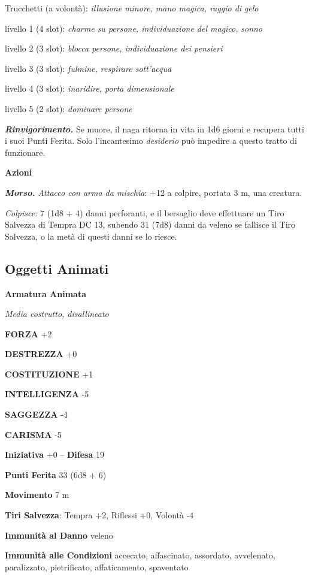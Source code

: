 \begin{multicols}{2}
	Trucchetti (a volontà): \textit{illusione minore, mano magica, raggio di} \textit{gelo}

	livello 1 (4 slot): \textit{charme su persone, individuazione del magico,} \textit{sonno}

	livello 2 (3 slot): \textit{blocca persone, individuazione dei pensieri}

	livello 3 (3 slot): \textit{fulmine, respirare sott'acqua}

	livello 4 (3 slot): \textit{inaridire, porta dimensionale}

	livello 5 (2 slot): \textit{dominare persone}

	\textit{\textbf{Rinvigorimento.}} Se muore, il naga ritorna in vita in 1d6 giorni e recupera tutti i suoi Punti Ferita. Solo l'incantesimo \textit{desiderio} può impedire a questo tratto di funzionare.

	\textbf{Azioni}

	\textit{\textbf{Morso.} Attacco con arma da mischia}: +12 a colpire, portata 3 m, una creatura.

	\textit{Colpisce:} 7 (1d8 + 4) danni perforanti, e il bersaglio deve effettuare un Tiro Salvezza di Tempra DC 13, subendo 31 (7d8) danni da veleno se fallisce il Tiro Salvezza, o la metà di questi danni se lo riesce.

	\subsection{Oggetti Animati}

	\medskip{}\textbf{Armatura Animata}

	\textit{Media costrutto, disallineato}

	\textbf{FORZA} +2

	\textbf{DESTREZZA} +0

	\textbf{COSTITUZIONE} +1

	\textbf{INTELLIGENZA} -5

	\textbf{SAGGEZZA} -4

	\textbf{CARISMA} -5

	\textbf{Iniziativa} +0 -- \textbf{Difesa} 19

	\textbf{Punti Ferita} 33 (6d8 + 6)

	\textbf{Movimento} 7 m

	\textbf{Tiri Salvezza}: Tempra +2, Riflessi +0, Volontà -4

	\textbf{Immunità al Danno} veleno

	\textbf{Immunità alle Condizioni} accecato, affascinato, assordato, avvelenato, paralizzato, pietrificato, affaticamento, spaventato


\end{multicols}
